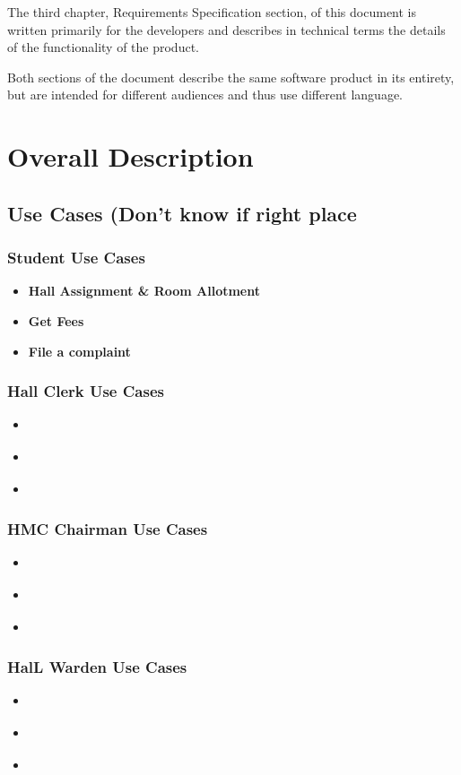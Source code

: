 \documentclass[letterpaper,12pt]{article}
\begin{document}
The third chapter, Requirements Specification section, of this document is written
primarily for the developers and describes in technical terms the details of the
functionality of the product.

Both sections of the document describe the same software product in its entirety,
but are intended for different audiences and thus use different language.
\section{\LARGE Overall Description}
\subsection{\Large Use Cases (Don't know if right place}
\subsubsection{Student Use Cases}
\begin{itemize}
    \item \textbf{Hall Assignment & Room Allotment}
    \item \textbf{Get Fees}
    \item \textbf{File a complaint}
\end{itemize}
\subsubsection{Hall Clerk Use Cases}
\begin{itemize}
    \item \textbf{}
    \item \textbf{}
    \item \textbf{}
\end{itemize}
\subsubsection{HMC Chairman Use Cases}
\begin{itemize}
    \item \textbf{}
    \item \textbf{}
    \item \textbf{}
\end{itemize}
\subsubsection{HalL Warden Use Cases}
\begin{itemize}
    \item \textbf{}
    \item \textbf{}
    \item \textbf{}
\end{itemize}
\end{document}
